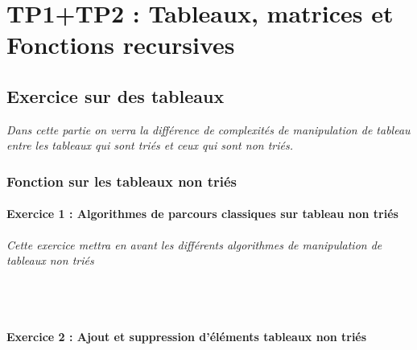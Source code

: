 \chapter{TP1+TP2 : Tableaux, matrices et Fonctions recursives}

\section{Exercice sur des tableaux}
\textit{Dans cette partie on verra la différence de complexités de manipulation de tableau entre les tableaux qui sont triés et ceux qui sont non triés.}

\subsection{Fonction sur les tableaux non triés}

\subsubsection{Exercice 1 : Algorithmes de parcours classiques sur tableau non triés}
\textit{Cette exercice mettra en avant les différents algorithmes de manipulation de tableaux non triés}

\inputminted[linenos,firstline=7, lastline=14]{cpp}{../sources/TP1-2/manipTableauxNonTries.c}

\inputminted[linenos,firstline=16, lastline=18]{cpp}{../sources/TP1-2/manipTableauxNonTries.c}

\inputminted[linenos,firstline=20, lastline=28]{cpp}{../sources/TP1-2/manipTableauxNonTries.c}

\inputminted[linenos,firstline=30, lastline=37]{cpp}{../sources/TP1-2/manipTableauxNonTries.c}

\subsubsection{Exercice 2 : Ajout et suppression d'éléments tableaux non triés}

\inputminted[linenos,firstline=7, lastline=13]{cpp}{../sources/TP1-2/modifTableauxNonTries.c}

\inputminted[linenos,firstline=15, lastline=27]{cpp}{../sources/TP1-2/modifTableauxNonTries.c}

